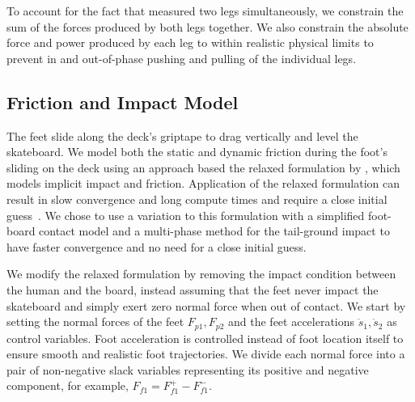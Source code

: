 \documentclass[default,iicol,pdflatex]{sn-jnl}
\begin{document}
To account for the fact that \citet{barker_relationships_2018} measured two legs simultaneously, we constrain the sum of the forces produced by both legs together. We also constrain the absolute force and power produced by each leg to within realistic physical limits to prevent in and out-of-phase pushing and pulling of the individual legs.

\subsection{Friction and Impact Model} \label{ss_friction}
The feet slide along the deck's griptape to drag vertically and level the skateboard. We model both the static and dynamic friction during the foot's sliding on the deck using an approach based the relaxed formulation by \citet{patel_contact-implicit_2019}, which models implicit impact and friction.
Application of the relaxed formulation can result in slow convergence and long compute times and require a close initial guess~\cite{shield_contact-implicit_2022}. We chose to use a variation to this formulation with a simplified foot-board contact model and a multi-phase method for the tail-ground impact to have faster convergence and no need for a close initial guess.

We modify the relaxed formulation by removing the impact condition between the human and the board, instead assuming that the feet never impact the skateboard and simply exert zero normal force when out of contact.
We start by setting the normal forces of the feet $F_{p1}, F_{p2}$ and the feet accelerations $\ddot{s}_1, \ddot{s}_2$ as control variables.
Foot acceleration is controlled instead of foot location itself to ensure smooth and realistic foot trajectories.
We divide each normal force into a pair of non-negative slack variables representing its positive and negative component, for example, $F_{f1} = F_{f1}^+ - F_{f1}^-$.
\end{document}
